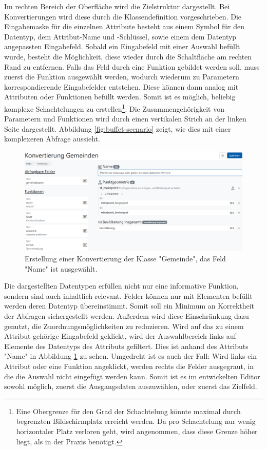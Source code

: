Im rechten Bereich der Oberfläche wird die Zielstruktur dargestellt. Bei Konvertierungen wird diese durch die Klassendefinition vorgeschrieben. Die Eingabemaske für die einzelnen Attribute besteht aus einem Symbol für den Datentyp, dem Attribut-Name und -Schlüssel, sowie einem dem Datentyp angepassten Eingabefeld. Sobald ein Eingabefeld mit einer Auswahl befüllt wurde, besteht die Möglichkeit, diese wieder durch die Schaltfläche am rechten Rand zu entfernen. Falls das Feld durch eine Funktion gebildet werden soll, muss zuerst die Funktion ausgewählt werden, wodurch wiederum zu Parametern korrespondierende Eingabefelder entstehen. Diese können dann analog mit Attributen oder Funktionen befüllt werden. Somit ist es möglich, beliebig komplexe Schachtelungen zu erstellen\footnote{Eine Obergrenze für den Grad der Schachtelung könnte maximal durch begrenzten Bildschirmplatz erreicht werden. Da pro Schachtelung nur wenig horizontaler Platz verloren geht, wird angenommen, dass diese Grenze höher liegt, als in der Praxis benötigt.}. Die Zusammengehörigkeit von Parametern und Funktionen wird durch einen vertikalen Strich an der linken Seite dargestellt. Abbildung \ref{fig:buffet-scenario} zeigt, wie dies mit einer komplexeren Abfrage aussieht.

\begin{figure}[ht]
  \begin{center}
    \includegraphics[width=.95\textwidth]{assets/buffet-selected.png}
  \end{center}
  \caption{Erstellung einer Konvertierung der Klasse "Gemeinde", das Feld "Name" ist ausgewählt.}
  \label{fig:buffet-selected}
\end{figure}

Die dargestellten Datentypen erfüllen nicht nur eine informative Funktion, sondern sind auch inhaltlich relevant. Felder können nur mit Elementen befüllt werden deren Datentyp übereinstimmt. Somit soll ein Minimum an Korrektheit der Abfragen sichergestellt werden. Außerdem wird diese Einschränkung dazu genutzt, die Zuordnungsmöglichkeiten zu reduzieren. Wird auf das zu einem Attribut gehörige Eingabefeld geklickt, wird der Auswahlbereich links auf Elemente des Datentyps des Attributs gefiltert. Dies ist anhand des Attributs "Name" in Abbildung \ref{fig:buffet-selected} zu sehen. Umgedreht ist es auch der Fall: Wird links ein Attribut oder eine Funktion angeklickt, werden rechts die Felder ausgegraut, in die die Auswahl nicht eingefügt werden kann. Somit ist es im entwickelten Editor sowohl möglich, zuerst die Ausgangsdaten auszuwählen, oder zuerst das Zielfeld.

